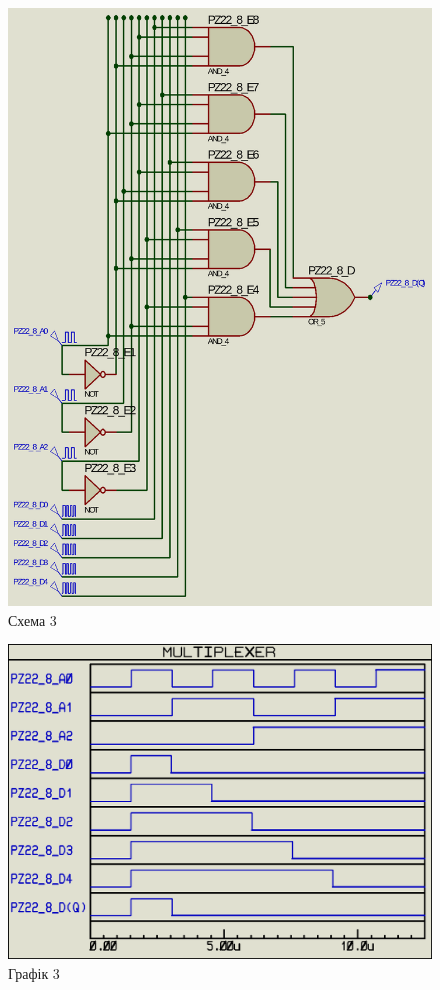 \documentclass{article}
\begin{document}
\begin{normalsize}
	\begin{figure}[H]
		\centering
		\includegraphics[scale=0.34]{s3}	
		\caption{Схема 3}
	\end{figure}
	\begin{figure}[H]
		\centering
		\includegraphics[scale=0.34]{g3}	
		\caption{Графік 3}
	\end{figure}


\end{normalsize}
\end{document}
